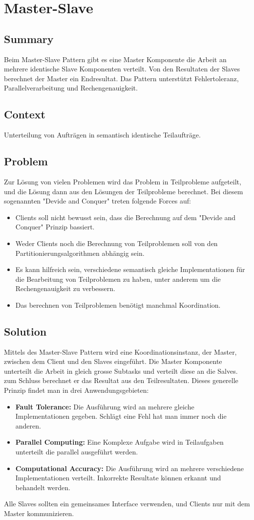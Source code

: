 \chapter{Master-Slave}

\section{Summary}
Beim Master-Slave Pattern gibt es eine Master Komponente die Arbeit an mehrere identische Slave Komponenten verteilt. Von den Resultaten der Slaves berechnet der Master ein Endresultat. Das Pattern unterstützt Fehlertoleranz, Parallelverarbeitung und Rechengenauigkeit.
\section{Context}
Unterteilung von Aufträgen in semantisch identische Teilaufträge.
\section{Problem}
Zur Lösung von vielen Problemen wird das Problem in Teilprobleme aufgeteilt, und die Lösung dann aus den Lösungen der Teilprobleme berechnet. Bei diesem sogenannten "Devide and Conquer" treten folgende Forces auf:
\begin{itemize}
	\item Clients soll nicht bewusst sein, dass die Berechnung auf dem "Devide and Conquer" Prinzip bassiert.
	\item Weder Clients noch die Berechnung von Teilproblemen soll von den Partitionierungsalgorithmen abhängig sein.
	\item Es kann hilfreich sein, verschiedene semantisch gleiche Implementationen für die Bearbeitung von Teilproblemen zu haben, unter anderem um die Rechengenauigkeit zu verbessern.
	\item Das berechnen von Teilproblemen benötigt manchmal Koordination.
\end{itemize}
\section{Solution}
Mittels des Master-Slave Pattern wird eine Koordinationsinstanz, der Master, zwischen dem Client und den Slaves eingeführt. Die Master Komponente unterteilt die Arbeit in gleich grosse Subtasks und verteilt diese an die Salves. zum Schluss berechnet er das Resultat aus den Teilresultaten. Dieses generelle Prinzip findet man in drei Anwendungsgebieten:
\begin{itemize}
	\item \textbf{Fault Tolerance:} Die Ausführung wird an mehrere gleiche Implementationen gegeben. Schlägt eine Fehl hat man immer noch die anderen.
	\item \textbf{Parallel Computing:} Eine Komplexe Aufgabe wird in Teilaufgaben unterteilt die parallel ausgeführt werden.
	\item \textbf{Computational Accuracy:} Die Ausführung wird an mehrere verschiedene Implementationen verteilt. Inkorrekte Resultate können erkannt und behandelt werden.
\end{itemize}
Alle Slaves sollten ein gemeinsames Interface verwenden, und Clients nur mit dem Master kommunizieren.
